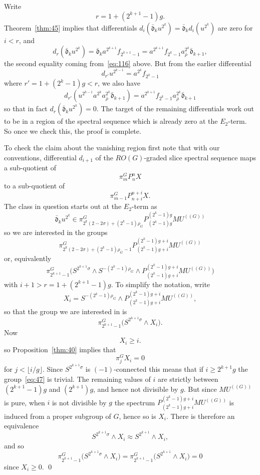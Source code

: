 \documentclass{amsart}
\theoremstyle{definition}
\theoremstyle{remark}
\newenvironment{pf}{\bigskip{\em Proof:\/}}{\qed\medskip}
\newcommand{\mutn}[1]{MU^{(\!(#1)\!)}}
\newcommand{\slc}[2]{P_{#1}^{#1}#2}
\newcommand{\gbar}{\bar}
\newcommand{\normrbar}{\gbar{\mathfrak d}}
\begin{document}
\begin{pf}
Write 
\[
r=1+(2^{k+1}-1)g.
\]
Theorem~\ref{thm:45} implies that differentials
$d_{i}(\normrbar_{k}u^{2^{k}})=\normrbar_{k} d_{i}(u^{2^{k}})$ are
zero for $i<r$, and
\[
d_{r}(\normrbar_{k} u^{2^{k}}) = \normrbar_{k}
a^{2^{k+1}}f_{2^{k+1}-1} = 
a^{2^{k+1}} f_{2^{k}-1} a_{\bar{\rho}}^{2^{k}} \normrbar_{k+1},
\]
the second equality coming from~\eqref{eq:116} above.  But from the
earlier differential
\[
d_{r'}u^{2^{k-1}} = a^{2^{k}} f_{2^{k}-1}
\]
where $r'=1+(2^{k}-1)g<r$, we also have
\[
d_{r'} (u^{2^{k-1}} a^{2^{k}} a_{\bar{\rho}}^{2^{k}}
\normrbar_{k+1}) = a^{2^{k+1}} f_{2^{k}-1} a_{\bar{\rho}}^{2^{k}} \normrbar_{k+1}
\]
so that in fact $d_{r}(\normrbar_{k} u^{2^{k}})=0$.  The target of the
remaining differentials work out to be in a region of the spectral
sequence which is already zero at the $E_{2}$-term.  So once we check
this, the proof is complete.

To check the claim about the vanishing region first note that with our
conventions, differential $d_{i+1}$ of the $RO(G)$-graded slice spectral
sequence maps a sub-quotient of
\[
\pi^{G}_{m}\slc{n}{X}
\]
to a sub-quotient of 
\[
\pi^{G}_{m-1}\slc{n+i}{X}.
\]
The class in question starts out at the $E_{2}$-term as
\[
\normrbar_{k}u^{2^{k}}\in \pi^{G}_{2^{k}(2-2\sigma)+(2^{k}-1)\rho_{G}}\slc{(2^{k}-1)g}{\mutn{G}}
\]
so we are interested in the groups
\[
\pi^{G}_{2^{k}(2-2\sigma)+(2^{k}-1)\rho_{G}-1}\slc{(2^{k}-1)g+i}{\mutn{G}} 
\]
or, equivalently 
\[
\pi^{G}_{2^{k+1}-1}\big(S^{2^{k+1}\sigma}\wedge
S^{-(2^{k}-1)\rho_{G}}\wedge \slc{(2^{k}-1)g+i}{\mutn{G}} \big)
\]
with $i+1 > r = 1+(2^{k+1}-1)g$.    To simplify the notation, write 
\[
X_{i} = S^{-(2^{k}-1)\rho_{G}}\wedge \slc{(2^{k}-1)g+i}{\mutn{G}},
\]
so that the group we are interested in is 
\begin{equation}
\label{eq:47}
\pi^{G}_{2^{k+1}-1}\big(S^{2^{k+1}\sigma}\wedge X_{i}\big).
\end{equation}
Now
\[
X_{i}\ge i.
\]
so Proposition~\ref{thm:40} implies that 
\[
\pi^{G}_{j}X_{i}=0
\]
for $j<\lfloor i/g \rfloor $.  Since $S^{2^{k+1}\sigma}$ is
$(-1)$-connected this means that if $i\ge 2^{k+1}g$ the
group~\eqref{eq:47} is trivial.  The remaining values of $i$ are
strictly between $(2^{k+1}-1)g$ and $(2^{k+1})g$, and hence not
divisible by $g$.  But since $\mutn{G}$ is pure, when $i$ is not
divisible by $g$ the spectrum $\slc{(2^{k}-1)g+i}{\mutn{G}}$ is
induced from a proper subgroup of $G$, hence so is $X_{i}$. There is
therefore an equivalence
\[
S^{2^{k+1}\sigma}\wedge X_{i} \approx
S^{2^{k+1}}\wedge X_{i},
\]
and so 
\[
\pi^{G}_{2^{k+1}-1}\big(S^{2^{k+1}\sigma}\wedge X_{i}\big) = 
\pi^{G}_{2^{k+1}-1}\big(S^{2^{k+1}}\wedge X_{i}\big) = 0
\]
since $X_{i}\ge 0$.
\end{pf}
\end{document}
